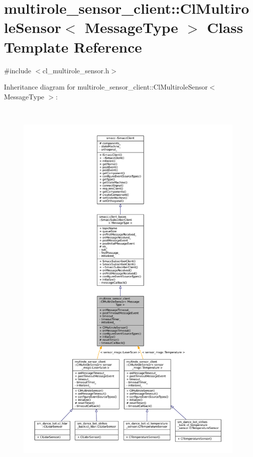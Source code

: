 \hypertarget{classmultirole__sensor__client_1_1ClMultiroleSensor}{}\section{multirole\+\_\+sensor\+\_\+client\+:\+:Cl\+Multirole\+Sensor$<$ Message\+Type $>$ Class Template Reference}
\label{classmultirole__sensor__client_1_1ClMultiroleSensor}


{\ttfamily \#include $<$cl\+\_\+multirole\+\_\+sensor.\+h$>$}



Inheritance diagram for multirole\+\_\+sensor\+\_\+client\+:\+:Cl\+Multirole\+Sensor$<$ Message\+Type $>$\+:
\nopagebreak
\begin{figure}[H]
\begin{center}
\leavevmode
\includegraphics[height=550pt]{classmultirole__sensor__client_1_1ClMultiroleSensor__inherit__graph}
\end{center}
\end{figure}


